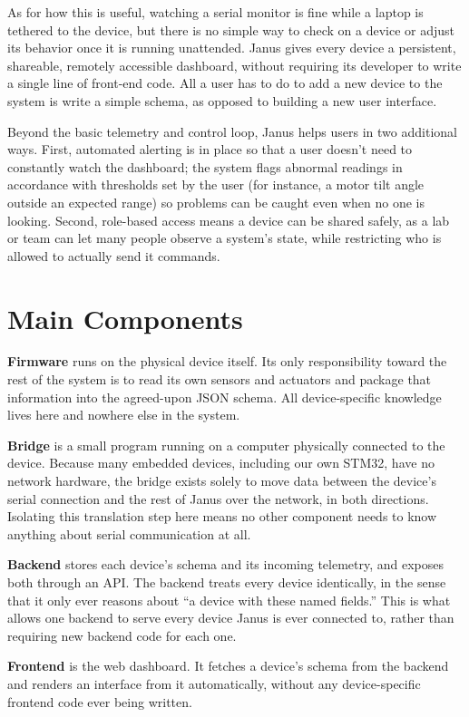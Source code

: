 \documentclass[11pt]{article}
\begin{document}
As for how this is useful, watching a serial monitor is fine while a laptop is tethered to the device, but there is no simple way to check on a device or adjust its behavior once it is running unattended. Janus gives every device a persistent, shareable, remotely accessible dashboard, without requiring its developer to write a single line of front-end code. All a user has to do to add a new device to the system is write a simple schema, as opposed to building a new user interface.

Beyond the basic telemetry and control loop, Janus helps users in two additional ways. First, automated alerting is in place so that a user doesn't need to constantly watch the dashboard; the system flags abnormal readings in accordance with thresholds set by the user (for instance, a motor tilt angle outside an expected range) so problems can be caught even when no one is looking. Second, role-based access means a device can be shared safely, as a lab or team can let many people observe a system's state, while restricting who is allowed to actually send it commands.

\section*{Main Components}

\textbf{Firmware} runs on the physical device itself. Its only responsibility toward the rest of the system is to read its own sensors and actuators and package that information into the agreed-upon JSON schema. All device-specific knowledge lives here and nowhere else in the system.

\textbf{Bridge} is a small program running on a computer physically connected to the device. Because many embedded devices, including our own STM32, have no network hardware, the bridge exists solely to move data between the device's serial connection and the rest of Janus over the network, in both directions. Isolating this translation step here means no other component needs to know anything about serial communication at all.

\textbf{Backend} stores each device's schema and its incoming telemetry, and exposes both through an API. The backend treats every device identically, in the sense that it only ever reasons about ``a device with these named fields.'' This is what allows one backend to serve every device Janus is ever connected to, rather than requiring new backend code for each one.

\textbf{Frontend} is the web dashboard. It fetches a device's schema from the backend and renders an interface from it automatically, without any device-specific frontend code ever being written.
\end{document}
